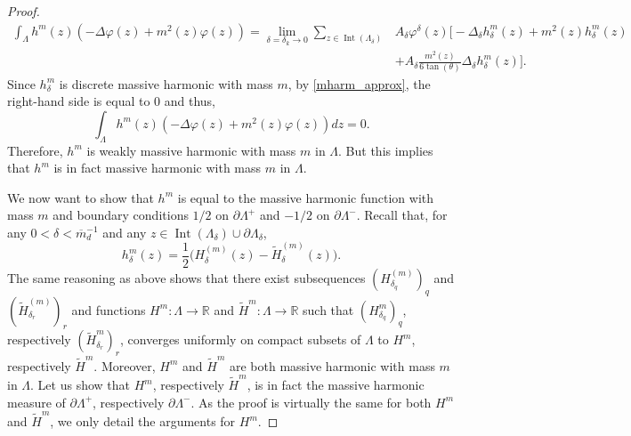 \documentclass{article}
\theoremstyle{definition}
\theoremstyle{remark}
\theoremstyle{remark}
\begin{document}
\begin{proof}
\begin{align*}
    \int_{\Lambda} h^m(z) (-\Delta \varphi(z) + m^2(z) \varphi(z)) = \lim_{\delta = \delta_{k} \to 0} \sum_{z \in \operatorname{Int}(\Lambda_{\delta})} & A_{\delta} \varphi^{\delta}(z) \bigg[ -\Delta_{\delta}  h_{\delta}^{m}(z)  + m^{2}(z)  h_{\delta}^{m}(z) \\
    &+ A_{\delta} \frac{m^2(z)}{6\tan(\theta)} \Delta_{\delta} h_{\delta}^{m}(z) \bigg].
\end{align*}
Since $h_{\delta}^{m}$ is discrete massive harmonic with mass $m$, by \eqref{mharm_approx}, the right-hand side is  equal to 0 and thus,
\begin{equation*}
    \int_{\Lambda} h^m(z) (-\Delta \varphi(z) + m^2(z) \varphi(z)) dz = 0.
\end{equation*}
Therefore, $h^m$ is weakly massive harmonic with mass $m$ in $\Lambda$. But this implies that $h^m$ is in fact massive harmonic with mass $m$ in $\Lambda$.

We now want to show that $h^m$ is equal to the massive harmonic function with mass $m$ and boundary conditions $1/2$ on $\partial \Lambda^{+}$ and $-1/2$ on $\partial \Lambda^{-}$. Recall that, for any $0<\delta < \overline{m}_d^{-1}$ and any $z \in \operatorname{Int}(\Lambda_{\delta}) \cup \partial \Lambda_{\delta}$,
\begin{equation} \label{eq_dec_hm}
    h_{\delta}^m(z) = \frac{1}{2} \bigg( H^{(m)}_{\delta}(z) - \tilde H^{(m)}_{\delta}(z) \bigg).
\end{equation}
The same reasoning as above shows that there exist subsequences $(H^{(m)}_{\delta_q})_q$ and $(\tilde H^{(m)}_{\delta_r})_r$ and functions $H^m: \Lambda \to \mathbb{R}$ and $\tilde H^m: \Lambda \to \mathbb{R}$ such that $(H^m_{\delta_q})_q$, respectively $(\tilde H^m_{\delta_r})_r$, converges uniformly on compact subsets of $\Lambda$ to $H^m$, respectively $\tilde H^m$. Moreover, $H^m$ and $\tilde H^m$ are both massive harmonic with mass $m$ in $\Lambda$. Let us show that $H^m$, respectively $\tilde H^m$, is in fact the massive harmonic measure of $\partial \Lambda^{+}$, respectively $\partial \Lambda^{-}$. As the proof is virtually the same for both $H^m$ and $\tilde H^m$, we only detail the arguments for $H^m$. 



\end{proof}
\end{document}

